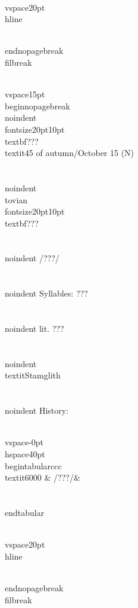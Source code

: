 \\vspace{20pt}\\hline

\\end{nopagebreak}
\\filbreak



\\vspace{15pt}
\\begin{nopagebreak}
\\noindent{\\fontsize{20pt}{10pt}\\textbf{???} } \\textit{45 of autumn/October 15} (N)\\\\
\\noindent {\\tovian \\fontsize{20pt}{10pt} \\textbf{???} }\\\\
\\noindent /???/\\\\
\\noindent Syllables: ???\\\\
\\noindent lit. ???\\\\
\\noindent \\textit{Stamglith}\\\\


\\noindent History:

\\vspace{-0pt}
\\hspace{40pt}
\\begin{tabular}{ccc}
\\textit{6000} & /???/& \\\\
\\end{tabular}

\\vspace{20pt}\\hline

\\end{nopagebreak}
\\filbreak



